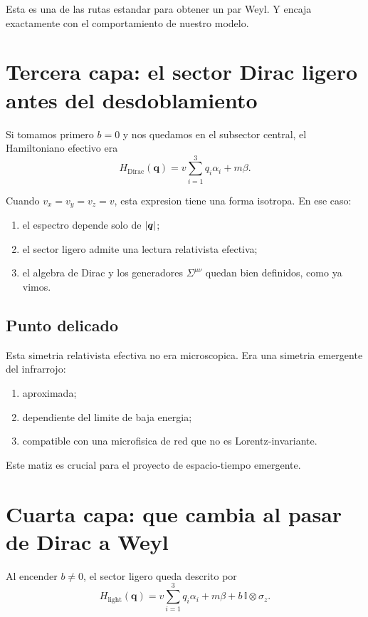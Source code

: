 Esta es una de las rutas estandar para obtener un par Weyl. Y encaja exactamente con el comportamiento de nuestro modelo.

\section{Tercera capa: el sector Dirac ligero antes del desdoblamiento}
Si tomamos primero \(b=0\) y nos quedamos en el subsector central, el Hamiltoniano efectivo era
\begin{equation}
H_{\text{Dirac}}(\bm{q})=
v\sum_{i=1}^3 q_i\alpha_i + m\beta.
\label{c11:eq:Diraceff}
\end{equation}

Cuando \(v_x=v_y=v_z=v\), esta expresion tiene una forma isotropa. En ese caso:
\begin{enumerate}[label=\arabic*.]
    \item el espectro depende solo de \(\abs{\bm{q}}\);
    \item el sector ligero admite una lectura relativista efectiva;
    \item el algebra de Dirac y los generadores \(\Sigma^{\mu\nu}\) quedan bien definidos, como ya vimos.
\end{enumerate}

\subsection{Punto delicado}
Esta simetria relativista efectiva no era microscopica. Era una simetria emergente del infrarrojo:
\begin{enumerate}[label=\arabic*.]
    \item aproximada;
    \item dependiente del limite de baja energia;
    \item compatible con una microfisica de red que no es Lorentz-invariante.
\end{enumerate}

Este matiz es crucial para el proyecto de espacio-tiempo emergente.

\section{Cuarta capa: que cambia al pasar de Dirac a Weyl}
Al encender \(b\neq 0\), el sector ligero queda descrito por
\begin{equation}
H_{\text{light}}(\bm{q})=
v\sum_{i=1}^3 q_i \alpha_i
+
m\beta
+
b\,\mathbb{I}\otimes \sigma_z.
\label{c11:eq:light}
\end{equation}

